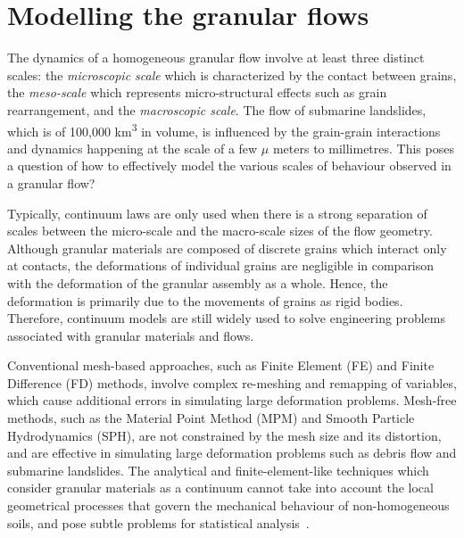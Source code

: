 \section{Modelling the granular flows}

The dynamics of a homogeneous granular flow involve at least three distinct 
scales: the \textit{microscopic scale} which is characterized by the contact 
between grains, the \textit{meso-scale} which represents micro-structural 
effects such as grain rearrangement, and the \textit{macroscopic scale}. The 
flow of submarine landslides, which is of 100,000 \si{\km\cubed} in volume, is 
influenced by the grain-grain interactions and dynamics happening at the scale 
of a few $\mu$ meters to millimetres. This poses a question of how to 
effectively model the various scales of behaviour observed in a granular 
flow?

Typically, continuum laws are only used when there is a strong separation of 
scales between the micro-scale and the macro-scale sizes of the flow geometry. 
Although granular materials are composed of discrete grains which interact only 
at contacts, the deformations of individual grains are negligible in comparison 
with the deformation of the granular assembly as a whole. Hence, the 
deformation is primarily due to the movements of grains as rigid bodies. 
Therefore, continuum models are still widely used to solve engineering problems 
associated with granular materials and flows. 

Conventional mesh-based approaches, such as Finite Element (FE) and Finite 
Difference (FD) methods, involve complex re-meshing and remapping of variables, 
which cause additional errors in simulating large deformation problems. 
Mesh-free methods, such as the Material Point Method (MPM) and Smooth Particle 
Hydrodynamics (SPH), are not constrained by the mesh size and its distortion, 
and are effective in simulating large deformation problems such as debris 
flow and submarine landslides. The analytical and finite-element-like 
techniques which consider granular materials as a continuum cannot take into 
account the local geometrical processes that govern the mechanical behaviour of 
non-homogeneous soils, and pose subtle problems for statistical 
analysis~\citep{Mehta1994}. 


